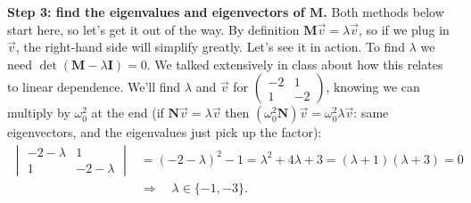 \documentclass[12pt]{article}
\numberwithin{equation}{section}
\newcommand{\wo}{\omega_0}
\begin{document}
\noindent\textbf{Step 3: find the eigenvalues and eigenvectors of
$\mathbf{M}$.} Both methods below start here, so let's get it out of the
way. By definition $\mathbf{M}\vec{v} = \lambda\vec{v}$, so if we plug in
$\vec{v}$, the right-hand side will simplify greatly. Let's see it in
action. To find $\lambda$ we need $\det(\mathbf{M} - \lambda\mathbf{I}) =
0$. We talked extensively in class about how this relates to linear
dependence. We'll find $\lambda$ and
$\vec{v}$ for $\left(\begin{smallmatrix} -2 & 1 \\ 1 & -2
\end{smallmatrix}\right)$, knowing we can multiply by $\wo^2$ at the end
(if $\mathbf{N}\vec{v} = \lambda\vec{v}$ then $(\wo^2\mathbf{N})\vec{v} =
\wo^2\lambda\vec{v}$: same eigenvectors, and the eigenvalues just pick up
the factor):
\begin{equation}
  \begin{aligned}
    \begin{vmatrix} -2-\lambda & 1 \\ 1 & -2-\lambda \end{vmatrix}
    &= (-2-\lambda)^2 - 1 = \lambda^2 + 4\lambda + 3 = (\lambda+1)(\lambda+3) = 0 \\
    &\Rightarrow\quad \lambda \in \{-1, -3\}.
  \end{aligned}
\end{equation}
\end{document}
